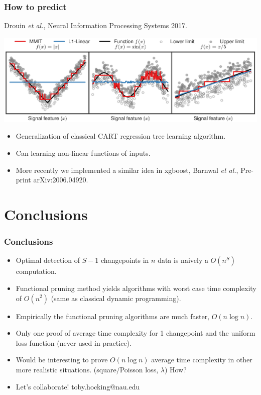 \documentclass{beamer}
\begin{document}
\begin{frame}
  \frametitle{How to predict }
  
  Drouin \emph{et al.}, Neural Information Processing Systems 2017.

  \includegraphics[width=\linewidth]{mmit-functions}
  \begin{itemize}
  \item Generalization of classical CART regression tree learning algorithm.
  \item Can learning non-linear functions of inputs.
  \item More recently we implemented a similar idea in xgboost,
    Barnwal \emph{et al.}, Pre-print arXiv:2006.04920.
  \end{itemize}
\end{frame}




\section{Conclusions}

\begin{frame}[fragile]
  \frametitle{Conclusions}

  \begin{itemize}
  \item Optimal detection of $S-1$ changepoints in $n$ data is naively
    a $O(n^S)$ computation.  
  \item Functional pruning method yields algorithms with worst case
    time complexity of $O(n^2)$ (same as classical dynamic
    programming).
  \item Empirically the functional pruning algorithms are much faster,
    $O(n\log n)$.
  \item Only one proof of average time complexity for 1 changepoint
    and the uniform loss function (never used in practice).
  \item Would be interesting to prove $O(n\log n)$ average time complexity in
    other more realistic situations. (square/Poisson loss, $\lambda$) How?
  \item Let's collaborate! toby.hocking@nau.edu
  \end{itemize}
  
\end{frame}
\end{document}
